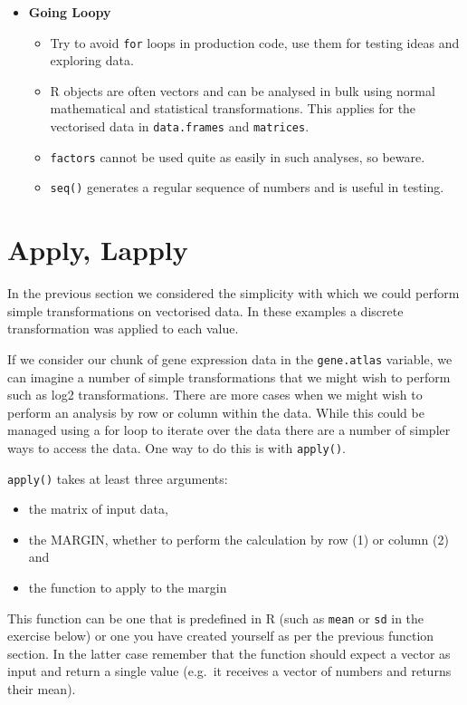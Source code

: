 \documentclass[a4paper]{book}
\providecommand{\tightlist}{%
  \setlength{\itemsep}{0pt}\setlength{\parskip}{0pt}}
\newenvironment{rmdblock}[1]
  {\vspace{1.5em}\begin{shaded*}
  \begin{itemize}
  \renewcommand{\labelitemi}{
    \raisebox{-.7\height}[0pt][0pt]{
      {\setkeys{Gin}{width=3em,keepaspectratio}\texttt{[image: images/\#1]}}
    }
  }
  \item
  }
  {
  \end{itemize}
  \end{shaded*}
  }
\newenvironment{rmdtip}
  {\begin{rmdblock}{tip}}
  {\end{rmdblock}}
\begin{document}
\begin{rmdtip}
\textbf{Going Loopy}

\begin{itemize}
\tightlist
\item
  Try to avoid \texttt{for} loops in production code, use them for
  testing ideas and exploring data.
\item
  R objects are often vectors and can be analysed in bulk using normal
  mathematical and statistical transformations. This applies for the
  vectorised data in \texttt{data.frames} and \texttt{matrices}.
\item
  \texttt{factors} cannot be used quite as easily in such analyses, so
  beware.
\item
  \texttt{seq()} generates a regular sequence of numbers and is useful
  in testing.
\end{itemize}
\end{rmdtip}

\section{Apply, Lapply}\label{apply-lapply}

In the previous section we considered the simplicity with which we could
perform simple transformations on vectorised data. In these examples a
discrete transformation was applied to each value.

If we consider our chunk of gene expression data in the
\texttt{gene.atlas} variable, we can imagine a number of simple
transformations that we might wish to perform such as log2
transformations. There are more cases when we might wish to perform an
analysis by row or column within the data. While this could be managed
using a for loop to iterate over the data there are a number of simpler
ways to access the data. One way to do this is with \texttt{apply()}.

\texttt{apply()} takes at least three arguments:

\begin{itemize}
\tightlist
\item
  the matrix of input data,
\item
  the MARGIN, whether to perform the calculation by row (1) or column
  (2) and
\item
  the function to apply to the margin
\end{itemize}

This function can be one that is predefined in R (such as \texttt{mean}
or \texttt{sd} in the exercise below) or one you have created yourself
as per the previous function section. In the latter case remember that
the function should expect a vector as input and return a single value
(e.g.~it receives a vector of numbers and returns their mean).
\end{document}
